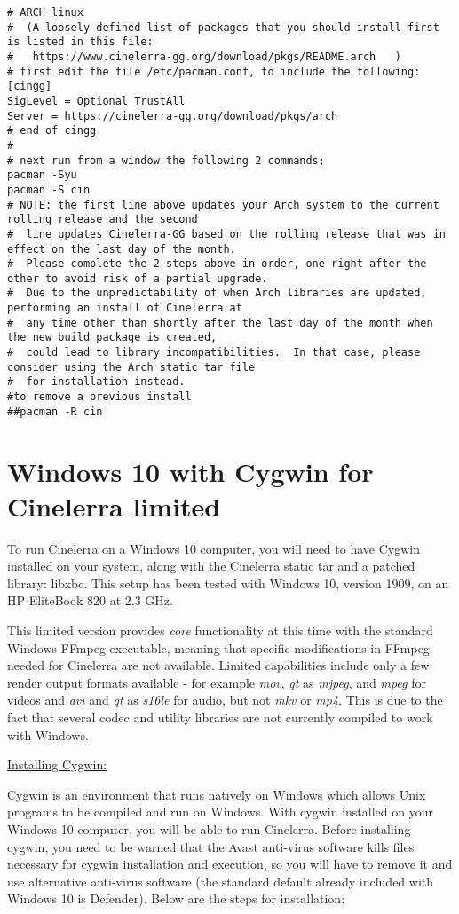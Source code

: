 \begin{lstlisting}[numbers=none]
# ARCH linux
#  (A loosely defined list of packages that you should install first is listed in this file:
#   https://www.cinelerra-gg.org/download/pkgs/README.arch   )
# first edit the file /etc/pacman.conf, to include the following:
[cingg]
SigLevel = Optional TrustAll
Server = https://cinelerra-gg.org/download/pkgs/arch
# end of cingg
#
# next run from a window the following 2 commands;
pacman -Syu
pacman -S cin
# NOTE: the first line above updates your Arch system to the current rolling release and the second
#  line updates Cinelerra-GG based on the rolling release that was in effect on the last day of the month.
#  Please complete the 2 steps above in order, one right after the other to avoid risk of a partial upgrade.
#  Due to the unpredictability of when Arch libraries are updated, performing an install of Cinelerra at
#  any time other than shortly after the last day of the month when the new build package is created,
#  could lead to library incompatibilities.  In that case, please consider using the Arch static tar file
#  for installation instead.
#to remove a previous install
##pacman -R cin
\end{lstlisting}

\section{Windows 10 with Cygwin for Cinelerra limited}%
\label{sec:ms_windows10}

To run Cinelerra on a Windows 10 computer, you will need to have Cygwin installed on your system, 
along with the  Cinelerra static tar and a patched library: libxbc.  This setup has been tested 
with Windows 10, version 1909, on an HP EliteBook 820 at 2.3 GHz.

This limited version provides \textit{core} functionality at this time with the standard Windows FFmpeg
executable, meaning that specific modifications in FFmpeg needed for Cinelerra are not available. 
Limited capabilities include only a few render output formats available - for example \textit{mov}, \textit{qt} 
as \textit{mjpeg}, and \textit{mpeg} for videos and \textit{avi} and \textit{qt} as \textit{s16le} 
for audio, but not \textit{mkv} or \textit{mp4}.  
This is due to the fact that several codec and utility libraries are not currently compiled to 
work with Windows.

\underline{Installing Cygwin:}

Cygwin is an environment that runs natively on Windows which allows Unix programs to be compiled 
and run on Windows.  With cygwin installed on your Windows 10 computer, you will be able to run 
Cinelerra.  Before installing cygwin, you need to be warned that the Avast anti-virus software 
kills files necessary for cygwin installation and execution, so you will have to remove it and 
use alternative anti-virus software (the standard default already included with Windows 10 
is Defender). Below are the steps for installation:


